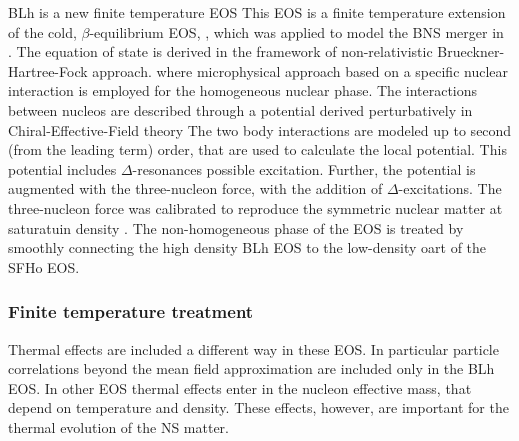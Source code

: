 \documentclass[11pt,a4paper,headinclude=true,DIV=14,BCOR=8mm,chapterprefix,listof=totoc,twoside,openright,abstracton]{scrbook}
\begin{document}
BLh is a new finite temperature EOS \cite{Logoteta:2020yxf}
This EOS is a finite temperature extension of the cold, $\beta$-equilibrium EOS, \cite{Bombaci:2018ksa},
which was applied to model the BNS merger in \cite{Endrizzi:2018uwl}.
The equation of state is derived in the framework of non-relativistic Brueckner-Hartree-Fock approach.
where microphysical approach based on a specific nuclear interaction is employed for the homogeneous nuclear phase.
The interactions between nucleos are described through a potential derived perturbatively 
in Chiral-Effective-Field theory \cite{Machleidt:2011zz}
The two body interactions are modeled up to second (from the leading term) order, that are used to calculate the local potential. This potential includes $\Delta$-resonances possible excitation. 
Further, the potential is augmented with the three-nucleon force, with the addition of $\Delta$-excitations.
The three-nucleon force was calibrated to reproduce the symmetric nuclear matter at saturatuin density \cite{Logoteta:2016nzc}.
The non-homogeneous phase of the EOS is treated by smoothly connecting the high density BLh EOS to the low-density oart of the SFHo EOS.


\subsubsection{Finite temperature treatment}


Thermal effects are included a different way in these EOS. 
In particular particle correlations beyond the mean field approximation are included only in the BLh EOS.
In other EOS thermal effects enter in the nucleon effective mass, that depend on temperature and density.
These effects, however, are important for the thermal evolution of the NS matter.
\end{document}
